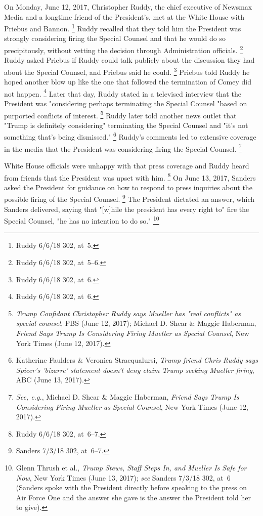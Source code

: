 {On Monday, June 12, 2017, Christopher Ruddy, the chief executive of Newsmax Media and a longtime friend of the President's, met at the White House with Priebus and Bannon.%
\footnote{Ruddy 6/6/18 302, at~5.}
Ruddy recalled that they told him the President was strongly considering firing the Special Counsel and that he would do so precipitously, without vetting the decision through Administration officials.%
\footnote{Ruddy 6/6/18 302, at~5--6.}
Ruddy asked Priebus if Ruddy could talk publicly about the discussion they had about the Special Counsel, and Priebus said he could.%
\footnote{Ruddy 6/6/18 302, at~6.}
Priebus told Ruddy he hoped another blow up like the one that followed the termination of Comey did not happen.%
\footnote{Ruddy 6/6/18 302, at~6.}
Later that day, Ruddy stated in a televised interview that the President was "considering perhaps terminating the Special Counsel "based on purported conflicts of interest.%
\footnote{\textit{Trump Confidant Christopher Ruddy says Mueller has "real conflicts" as special counsel}, PBS (June 12, 2017);
Michael D. Shear \& Maggie Haberman, \textit{Friend Says Trump Is Considering Firing Mueller as Special Counsel}, New York Times (June 12, 2017).}
Ruddy later told another news outlet that "Trump is definitely considering" terminating the Special Counsel and "it's not something that's being dismissed."%
\footnote{Katherine Faulders \& Veronica Stracqualursi, \textit{Trump friend Chris Ruddy says Spicer's 'bizarre' statement doesn't deny claim Trump seeking Mueller firing}, ABC (June 13, 2017).}
Ruddy's comments led to extensive coverage in the media that the President was considering firing the Special Counsel.%
\footnote{\textit{See, e.g.}, Michael D. Shear \& Maggie Haberman, \textit{Friend Says Trump Is Considering Firing Mueller as Special Counsel}, New York Times (June 12, 2017).}

White House officials were unhappy with that press coverage and Ruddy heard from friends that the President was upset with him.%
\footnote{Ruddy 6/6/18 302, at~6--7.}
On June 13, 2017, Sanders asked the President for guidance on how to respond to press inquiries about the possible firing of the Special Counsel.%
\footnote{Sanders 7/3/18 302, at~6--7.}
The President dictated an answer, which Sanders delivered, saying that "[w]hile the president has every right to" fire the Special Counsel, "he has no intention to do so."%
\footnote{Glenn Thrush et al., \textit{Trump Stews, Staff Steps In, and Mueller Is Safe for Now}, New York Times (June 13, 2017);
\textit{see} Sanders 7/3/18 302, at~6 (Sanders spoke with the President directly before speaking to the press on Air Force One and the answer she gave is the answer the President told her to give).}

}
